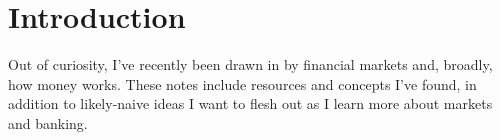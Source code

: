 \section*{Introduction}

Out of curiosity, I've recently been drawn in by financial markets and, broadly, how money works.  These notes include resources and concepts I've found, in addition to likely-naive ideas I want to flesh out as I learn more about markets and banking.